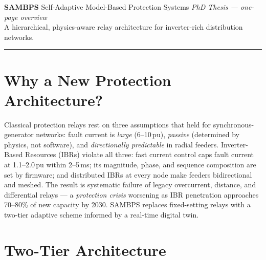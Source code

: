\documentclass[10pt,a4paper]{article}
\begin{document}
\pagestyle{empty}

\noindent
{\LARGE\bfseries\color{thesisblue} SAMBPS}\enspace
{\large Self-Adaptive Model-Based Protection Systems}
\hfill{\small\itshape\color{thesisgray}PhD Thesis --- one-page overview}\\[-2pt]
{\small\color{thesisgray}A hierarchical, physics-aware relay architecture for inverter-rich distribution networks.}

\vspace{1pt}\textcolor{thesisblue!30}{\rule{\linewidth}{0.8pt}}\vspace{3pt}

\section{Why a New Protection Architecture?}

\small
Classical protection relays rest on three assumptions that held for synchronous-generator networks:
fault current is \emph{large} (6--10\,pu), \emph{passive} (determined by physics, not software), and
\emph{directionally predictable} in radial feeders.
Inverter-Based Resources (IBRs) violate all three: fast current control caps fault current at
1.1--2.0\,pu within 2--5\,ms; its magnitude, phase, and sequence composition are set by firmware;
and distributed IBRs at every node make feeders bidirectional and meshed.
The result is systematic failure of legacy overcurrent, distance, and differential relays ---
a \emph{protection crisis} worsening as IBR penetration approaches 70--80\% of new capacity by 2030.
SAMBPS replaces fixed-setting relays with a two-tier adaptive scheme informed by a real-time digital twin.

\vspace{3pt}

\section{Two-Tier Architecture}
\end{document}
